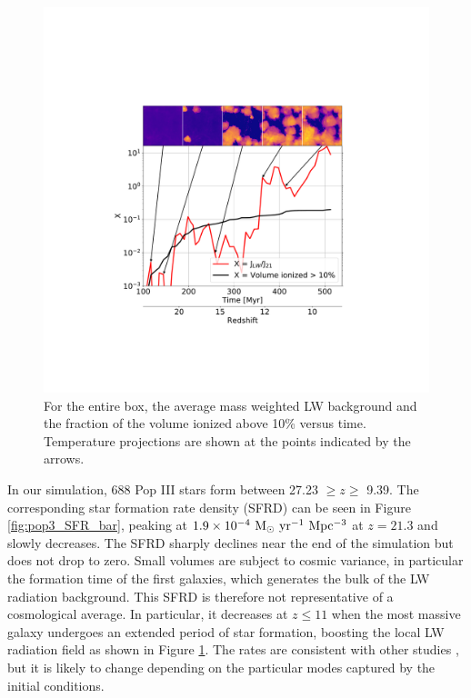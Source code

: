 \documentclass[fleqn,usenatbib]{mnras}
\begin{document}
\begin{figure}
	\includegraphics[width=\columnwidth]{images/JLW_xe_mass.pdf}
    \caption{For the entire box, the average mass weighted LW background and the fraction of the volume ionized above 10\% versus time. Temperature projections are shown at the points indicated by the arrows.}
    \label{fig:JLW_xe_mass}
\end{figure}

In our simulation, 688 Pop III stars form between 27.23 $\geq z \geq$ 9.39. The corresponding star formation rate density (SFRD) can be seen in Figure \ref{fig:pop3_SFR_bar}, peaking at $1.9 \times 10^{-4} \ \rm M_{\odot} \ yr^{-1} \ Mpc^{-3}$ at $z = 21.3$ and slowly decreases. The SFRD sharply declines near the end of the simulation but does not drop to zero. Small volumes are subject to cosmic variance, in particular the formation time of the first galaxies, which generates the bulk of the LW radiation background.  This SFRD is therefore not representative of a cosmological average.  In particular, it decreases at $z \le 11$ when the most massive galaxy undergoes an extended period of star formation, boosting the local LW radiation field as shown in Figure \ref{fig:JLW_xe_mass}.  The rates are consistent with other studies \citep[e.g.][]{Xu13, Magg16}, but it is likely to change depending on the particular modes captured by the initial conditions.
\end{document}
